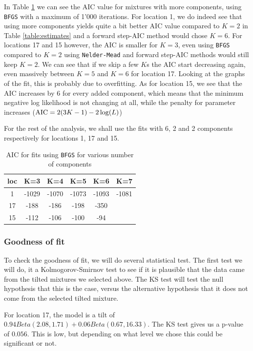 \documentclass[10pt]{report}
\begin{document}
In Table \ref{table:AIC} we can see the AIC value for mixtures with more components, using \texttt{BFGS} with a maximum of 1'000 iterations. For location 1, we do indeed see that using more components yields quite a bit better AIC value compared to $K=2$ in Table \ref{table:estimates} and a forward step-AIC method would chose $K=6$. For locations 17 and 15 however, the AIC is smaller for $K=3$, even using \texttt{BFGS} compared to $K=2$ using \texttt{Nelder-Mead} and forward step-AIC methods would still keep $K=2$. We can see that if we skip a few $K$s the AIC start decreasing again, even massively between $K=5$ and $K=6$ for location 17. Looking at the graphs of the fit, this is probably due to overfitting. 
As for location 15, we see that the AIC increases by 6 for every added component, which means that the minimum negative log likelihood is not changing at all, while the penalty for parameter increases (${\rm AIC} = 2(3K-1) - 2\log(L)$)

For the rest of the analysis, we shall use the fits with 6, 2 and 2 components respectively for locations 1, 17 and 15.

\begin{table}
\centering
\begin{tabular}{|c||c|c|c|c|c|}
\hline
loc & K=3 & K=4 & K=5 & K=6 & K=7\\
\hline
1 & -1029 & -1070 & -1073 & -1093 & -1081 \\
17 & -188 & -186 & -198 & -350 & \\
15 & -112 & -106 & -100 & -94 & \\
\hline
\end{tabular}
\caption{AIC for fits using \texttt{BFGS} for various number of components}
\label{table:AIC}
\end{table}

\subsubsection{Goodness of fit}
To check the goodness of fit, we will do several statistical test. The first test we will do, it a Kolmogorov-Smirnov test to see if it is plausible that the data came from the tilted mixtures we selected above. The KS test will test the null hypothesis that this is the case, versus the alternative hypothesis that it does not come from the selected tilted mixture.



For location 17, the model is a tilt of $0.94Beta(2.08,1.71) + 0.06Beta(0.67, 16.33)$. The KS test gives us a p-value of $0.056$. This is low, but depending on what level we chose this could be significant or not.
\end{document}
